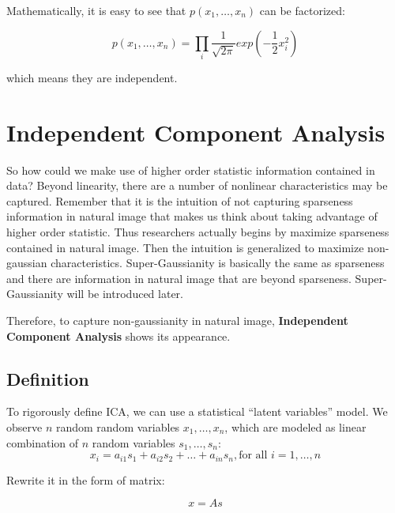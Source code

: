 \documentclass[a4paper]{book}
\begin{document}
      Mathematically, it is easy to see that $p(x_{1}, \ldots, x_{n})$
      can be factorized:

      \begin{displaymath}
        p(x_{1}, \ldots, x_{n}) =
        \prod\limits_{i}\frac{1}{\sqrt{2\pi}}exp(-\frac{1}{2}x_{i}^{2})
      \end{displaymath}

      which means they are independent.

  \section{Independent Component Analysis}
  So how could we make use of higher order statistic information
  contained in data? Beyond linearity, there are a number of nonlinear
  characteristics may be captured. Remember that it is the intuition of
  not capturing sparseness information in natural image that makes us
  think about taking advantage of higher order statistic. Thus
  researchers actually begins by maximize sparseness contained in
  natural image\cite{Hyvrinen09}. Then the intuition is generalized to
  maximize non-gaussian characteristics.  Super-Gaussianity is basically
  the same as sparseness and there are information in natural image that
  are beyond sparseness\cite{Hyvrinen09}. Super-Gaussianity will be
  introduced later.

  Therefore, to capture non-gaussianity in natural image,
  \textbf{Independent Component Analysis} shows its appearance.

    \subsection{Definition}
    To rigorously define ICA, we can use a statistical ``latent
    variables'' model\cite{hyvärinen2004independent}. We observe $n$
    random random variables $x_{1}, \ldots, x_{n}$, which are modeled as
    linear combination of $n$ random variables $s_{1}, \ldots, s_{n}$:
    \begin{displaymath}
      x_{i} = a_{i1}s_{1} + a_{i2}s_{2} + \ldots + a_{in}s_{n},
      \text{for all $i = 1, \ldots, n$}
    \end{displaymath}

    Rewrite it in the form of matrix:

    \begin{equation}
      x = As
      \label{eq:ica}
    \end{equation}
\end{document}
